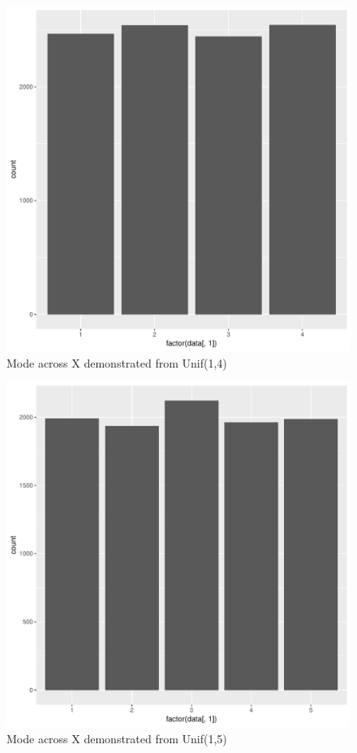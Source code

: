 \documentclass[11pt]{article}
\begin{document}
\begin{enumerate}
\begin{enumerate}
\begin{figure}[H]
	\end{figure}
	\begin{figure}[H]
		\centering
		\caption{Mode across X demonstrated from Unif(1,4)}
		\includegraphics[scale=.4]{4graph.pdf}
	\end{figure}
	\begin{figure}[H]
		\centering
		\caption{Mode across X demonstrated from Unif(1,5)}
		\includegraphics[scale=.4]{5graph.pdf}

\end{figure}
\end{enumerate}
\end{enumerate}
\end{document}
